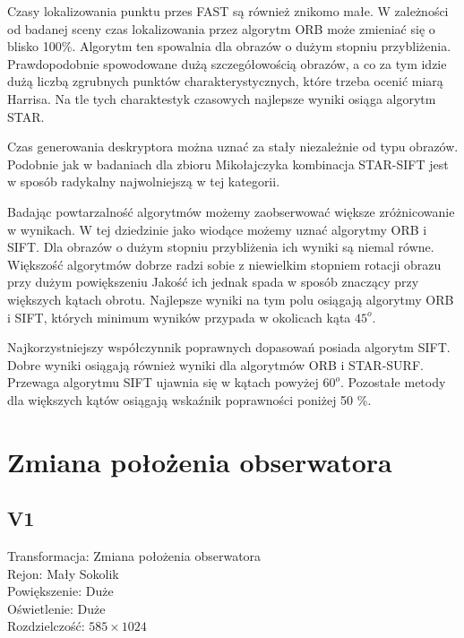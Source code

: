 Czasy lokalizowania punktu przes FAST są również znikomo małe. W zależności od badanej sceny czas lokalizowania przez algorytm ORB może zmieniać się o blisko 100\%. Algorytm ten spowalnia dla obrazów o dużym stopniu przybliżenia. Prawdopodobnie spowodowane dużą szczegółowością obrazów, a co za tym idzie dużą liczbą zgrubnych punktów charakterystycznych, które trzeba ocenić miarą Harrisa. Na tle tych charaktestyk czasowych najlepsze wyniki osiąga algorytm STAR.

Czas generowania deskryptora można uznać za stały niezależnie od typu obrazów. Podobnie jak w badaniach dla zbioru Mikołajczyka kombinacja STAR-SIFT jest w sposób radykalny najwolniejszą w tej kategorii.

Badając powtarzalność algorytmów możemy zaobserwować większe zróżnicowanie w wynikach. W tej dziedzinie jako wiodące możemy uznać algorytmy ORB i SIFT. Dla obrazów o dużym stopniu przybliżenia ich wyniki są niemal równe. Większość algorytmów dobrze radzi sobie z niewielkim stopniem rotacji obrazu przy dużym powiększeniu Jakość ich jednak spada w sposób znaczący przy większych kątach obrotu. Najlepsze wyniki na tym polu osiągają algorytmy ORB i SIFT, których minimum wyników przypada w okolicach kąta $45^o$.

Najkorzystniejszy współczynnik poprawnych dopasowań posiada algorytm SIFT. Dobre wyniki osiągają również wyniki dla algorytmów ORB i STAR-SURF. Przewaga algorytmu SIFT ujawnia się w kątach powyżej $60^o$. Pozostałe metody dla większych kątów osiągają wskaźnik poprawności poniżej 50 \%.





\FloatBarrier
\newpage
\section{Zmiana położenia obserwatora}
\FloatBarrier
\subsection{V1}
Transformacja: Zmiana położenia obserwatora\\
Rejon: Mały Sokolik\\
Powiększenie: Duże\\
Oświetlenie: Duże\\
Rozdzielczość: $585 \times 1024$

